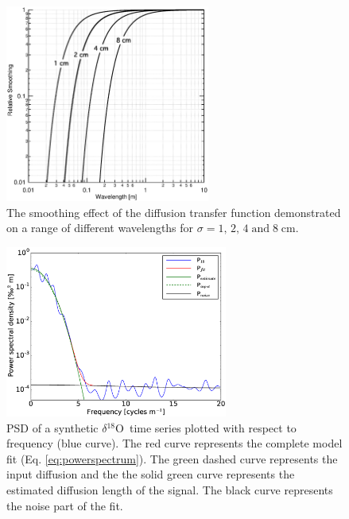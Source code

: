 \documentclass[11pt, draftcls, onecolumn]{IEEEtran} %
\numberwithin{equation}{section}
\numberwithin{table}{section}
\numberwithin{figure}{section}
\newcommand{\delOx}{$\delta{}^{18}\mathrm{O}$}
\begin{document}
\begin{figure}[]
	\vspace*{2mm}
	\begin{center}
		\includegraphics[width=0.6\textwidth]{Figure_3}
		\caption{The smoothing effect of the diffusion transfer function demonstrated on 
			a range of different wavelengths for $\sigma = 1,\, 2,\, 4\; \mathrm{and} \;8 \;	\mathrm{cm}$.} 
		\label{fig:transfer_function}
	\end{center}
\end{figure}


\begin{figure}[]	
	\vspace*{2mm}	
	\begin{center}		
		\includegraphics[width=0.65\textwidth]{Figure_4}		
		\caption{PSD of a synthetic \delOx~time series plotted with respect to frequency (blue curve).
				The red curve represents the complete model fit (Eq. \ref{eq:powerspectrum}).
				The green dashed curve represents the input diffusion 
				and the the solid green curve represents the estimated diffusion length
				of the signal. The black curve represents the noise part of the fit.}
		\label{fig:synthetic_power_spectra}	
	\end{center}
\end{figure}
\end{document}
